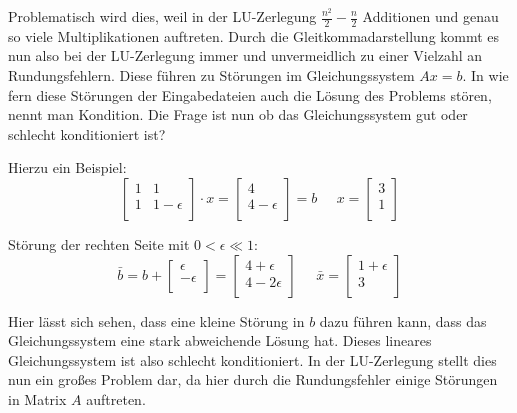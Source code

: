 \documentclass[course=erap]{aspdoc}
\begin{document}
Problematisch wird dies, weil in der LU-Zerlegung $\frac{n^2}{2} - \frac{n}{2} $
Additionen und genau so viele Multiplikationen auftreten\cite{LUGenauigkeit}.
Durch die Gleitkommadarstellung kommt es nun also bei der LU-Zerlegung immer und 
unvermeidlich zu einer Vielzahl an Rundungsfehlern. Diese führen zu Störungen im Gleichungssystem $Ax=b$. 
In wie fern diese Störungen der Eingabedateien auch die Lösung des Problems stören, nennt man Kondition. 
Die Frage ist nun ob das Gleichungssystem gut oder schlecht konditioniert ist?

Hierzu ein Beispiel:
  \begin{equation}
    \label{absBeis}
    \begin{bmatrix}
    1	& 1	 \\
    1	& 1-\epsilon\\
    \end{bmatrix}
    \cdot x = 
    \begin{bmatrix}
    4 \\
    4- \epsilon\\
    \end{bmatrix}
    = b\;\;\;\;\;
    x = 
    \begin{bmatrix}
    3 \\
    1\\
    \end{bmatrix}
  \end{equation}

Störung der rechten Seite mit $ 0 < \epsilon \ll 1$:
  \begin{equation}
    \label{absBeis2}
    \bar{b} = b + 
    \begin{bmatrix}
    \epsilon \\
    -\epsilon\\
    \end{bmatrix}
    = \begin{bmatrix}
    4 + \epsilon\\
    4- 2\epsilon\\
    \end{bmatrix}
    \;\;\;\;\;
    \bar{x} = 
    \begin{bmatrix}
    1 + \epsilon \\
    3\\
    \end{bmatrix}
  \end{equation}

Hier lässt sich sehen, dass eine kleine Störung in $b$ dazu führen kann, 
dass das Gleichungssystem eine stark abweichende Lösung hat.
Dieses lineares Gleichungssystem ist also schlecht konditioniert. In der LU-Zerlegung stellt dies nun ein großes 
Problem dar, da hier durch die Rundungsfehler einige Störungen in Matrix $A$ auftreten.
\end{document}
